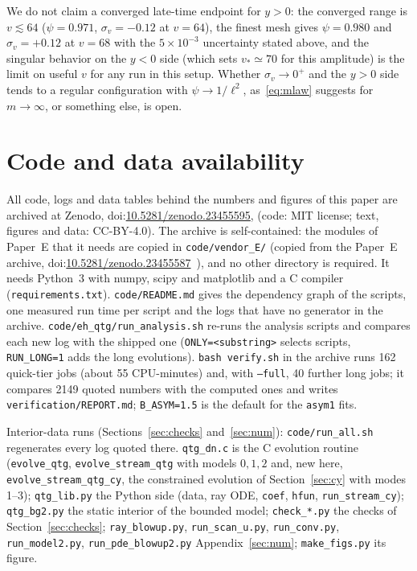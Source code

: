 \documentclass[11pt]{article}
\begin{document}
We do not claim a converged late-time endpoint for $y>0$: the converged range is $v\lesssim64$ ($\psi=0.971$, $\sigma_v=-0.12$ at $v=64$), the finest mesh gives $\psi=0.980$ and $\sigma_v=+0.12$ at $v=68$ with the $5\times10^{-3}$ uncertainty stated above, and the singular behavior on the $y<0$ side (which sets $v_*\simeq70$ for this amplitude) is the limit on useful $v$ for any run in this setup. Whether $\sigma_v\to0^{+}$ and the $y>0$ side tends to a regular configuration with $\psi\to1/\ell^{2}$, as~\eqref{eq:mlaw} suggests for $m\to\infty$, or something else, is open.


\section*{Code and data availability}
\raggedright
All code, logs and data tables behind the numbers and figures of this paper are archived at Zenodo, doi:\href{https://doi.org/10.5281/zenodo.23455595}{10.5281/zenodo.23455595}, (code: MIT license; text, figures and data: CC-BY-4.0). The archive is self-contained: the modules of Paper~E that it needs are copied in \texttt{code/vendor\_E/} (copied from the Paper~E archive, doi:\href{https://doi.org/10.5281/zenodo.23455587}{10.5281/zenodo.23455587}~\citep{PaperE}), and no other directory is required. It needs Python~3 with numpy, scipy and matplotlib and a C compiler (\texttt{requirements.txt}). \texttt{code/README.md} gives the dependency graph of the scripts, one measured run time per script and the logs that have no generator in the archive. \texttt{code/eh\_qtg/run\_analysis.sh} re-runs the analysis scripts and compares each new log with the shipped one (\texttt{ONLY=<substring>} selects scripts, \texttt{RUN\_LONG=1} adds the long evolutions). \texttt{bash verify.sh} in the archive runs 162 quick-tier jobs (about 55 CPU-minutes) and, with \texttt{--full}, 40 further long jobs; it compares 2149 quoted numbers with the computed ones and writes \texttt{verification/REPORT.md}; \texttt{B\_ASYM=1.5} is the default for the \texttt{asym1} fits.
\raggedright
Interior-data runs (Sections~\ref{sec:checks} and~\ref{sec:num}): \texttt{code/run\_all.sh} regenerates every log quoted there. \texttt{qtg\_dn.c} is the C evolution routine (\texttt{evolve\_qtg}, \texttt{evolve\_stream\_qtg} with models $0,1,2$ and, new here, \texttt{evolve\_stream\_qtg\_cy}, the constrained evolution of Section~\ref{sec:cy} with modes 1--3); \texttt{qtg\_lib.py} the Python side (data, ray ODE, \texttt{coef}, \texttt{hfun}, \texttt{run\_stream\_cy}); \texttt{qtg\_bg2.py} the static interior of the bounded model; \texttt{check\_*.py} the checks of Section~\ref{sec:checks}; \texttt{ray\_blowup.py}, \texttt{run\_scan\_u.py}, \texttt{run\_conv.py}, \texttt{run\_model2.py}, \texttt{run\_pde\_blowup2.py} Appendix~\ref{sec:num}; \texttt{make\_figs.py} its figure.
\end{document}
